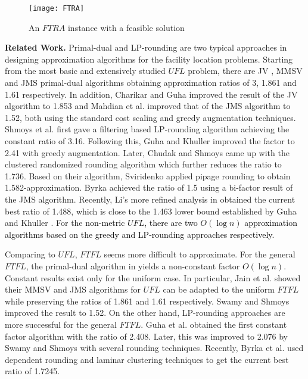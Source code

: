 \documentclass[10pt]{llncs}
\begin{document}
\begin{figure}
\begin{centering}
\texttt{[image: FTRA]}
\par\end{centering}

\caption{An $FTRA$ instance with a feasible solution}
\end{figure}


\textbf{Related Work.} Primal-dual and LP-rounding are two typical
approaches in designing approximation algorithms for the facility
location problems. Starting from the most basic and extensively studied
$UFL$ problem, there are JV \cite{jain01approximation}, MMSV \cite{Mohammad1.861}
and JMS \cite{Jain02greedy} primal-dual algorithms obtaining approximation
ratios of 3, 1.861 and 1.61 respectively. In addition, Charikar and
Guha \cite{Charikar051.7281.853} improved the result of the JV algorithm
to 1.853 and Mahdian et al. \cite{Mohammad06FLP} improved that of
the JMS algorithm to 1.52, both using the standard cost scaling and
greedy augmentation techniques. Shmoys et al. \cite{Shmoys97FL} first
gave a filtering based LP-rounding algorithm achieving the constant
ratio of 3.16. Following this, Guha and Khuller \cite{Guha99greedy}
improved the factor to 2.41 with greedy augmentation. Later, Chudak
and Shmoys \cite{Chudak0312e} came up with the clustered randomized
rounding algorithm which further reduces the ratio to 1.736. Based
on their algorithm, Sviridenko \cite{Sviridenko02improved1.58} applied
pipage rounding to obtain 1.582-approximation. Byrka \cite{jaroslaw2010optimal}
achieved the ratio of 1.5 using a bi-factor result of the JMS algorithm.
Recently, Li's more refined analysis in \cite{Li2011} obtained the
current best ratio of 1.488, which is close to the 1.463 lower bound
established by Guha and Khuller \cite{Guha99greedy}. For the \textcolor{black}{non-metric
$UFL$, there are two $O\left(\log n\right)$ approximation algorithms
\cite{Hochbaum-1982,Lin92filting} based on the greedy and LP-rounding
approaches respectively.}

Comparing to $UFL$, $FTFL$ seems more difficult to approximate.
For the general $FTFL$, the primal-dual algorithm in \cite{Jain00FTFL}
yields a non-constant factor \textcolor{black}{$O\left(\log n\right)$}.
Constant results exist only for the uniform case. In particular, Jain
et al. \cite{Jain03dualfitting,MohammadThesis2004} showed their MMSV
and JMS algorithms for $UFL$ can be adapted to the uniform $FTFL$
while preserving the ratios of 1.861 and 1.61 respectively. Swamy
and Shmoys \cite{Swamy08FTFL2.076} improved the result to 1.52. On
the other hand, LP-rounding approaches are more successful for the
general $FTFL$. Guha et al. \cite{Guha03FTFL2.41} obtained the first
constant factor algorithm with the ratio of 2.408. Later, this was
improved to 2.076 by Swamy and Shmoys \cite{Swamy08FTFL2.076} with
several rounding techniques. Recently, Byrka et al. \cite{JaroslawFTFL1.725}
used dependent rounding and laminar clustering techniques to get the
current best ratio of 1.7245.
\end{document}
